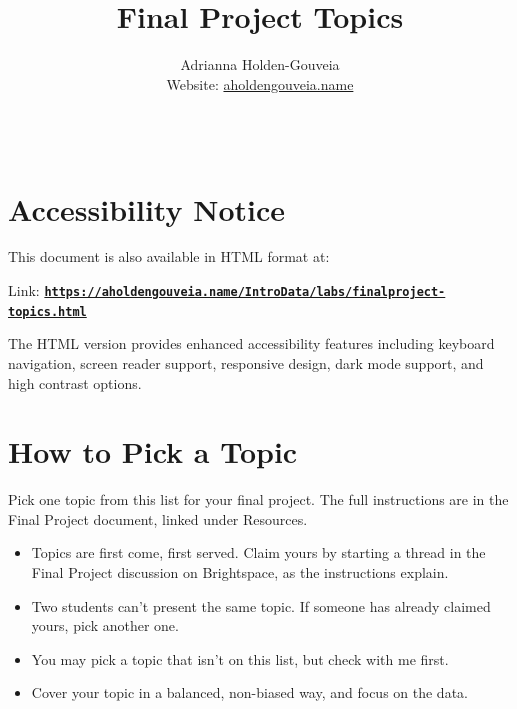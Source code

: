 \documentclass[12pt]{article}
\title{Final Project Topics}
\author{
        Adrianna Holden-Gouveia \\
        Website: \href{https://aholdengouveia.name}{aholdengouveia.name}\\ 
        \date{\vspace{-5ex}}
        \faGithub {: aholdengouveia} \\
        }
\begin{document}
\maketitle

\section*{Accessibility Notice}
This document is also available in HTML format at:

Link: \href{https://aholdengouveia.name/IntroData/labs/finalproject-topics.html}{\textbf{\nolinkurl{https://aholdengouveia.name/IntroData/labs/finalproject-topics.html}}}

The HTML version provides enhanced accessibility features including keyboard navigation, screen reader support, responsive design, dark mode support, and high contrast options.

\section*{How to Pick a Topic}
Pick one topic from this list for your final project. The full instructions are in the Final Project document, linked under Resources.
\begin{itemize}
    \item Topics are first come, first served. Claim yours by starting a thread in the Final Project discussion on Brightspace, as the instructions explain.
    \item Two students can't present the same topic. If someone has already claimed yours, pick another one.
    \item You may pick a topic that isn't on this list, but check with me first.
    \item Cover your topic in a balanced, non-biased way, and focus on the data.
\end{itemize}
\end{document}
